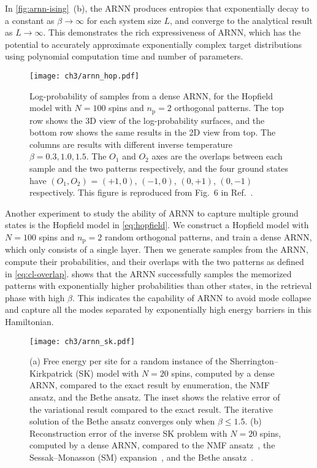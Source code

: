 In \cref{fig:arnn-ising}~(b), the ARNN produces entropies that exponentially decay to a constant as $\beta \to \infty$ for each system size $L$, and converge to the analytical result as $L \to \infty$. This demonstrates the rich expressiveness of ARNN, which has the potential to accurately approximate exponentially complex target distributions using polynomial computation time and number of parameters.

\begin{figure}[htb]
\centering
\texttt{[image: ch3/arnn\_hop.pdf]}
\caption[ARNN results of Hopfield model]{
Log-probability of samples from a dense ARNN, for the Hopfield model with $N = 100$ spins and $n_\text{p} = 2$ orthogonal patterns.
The top row shows the 3D view of the log-probability surfaces, and the bottom row shows the same results in the 2D view from top.
The columns are results with different inverse temperature $\beta = 0.3, 1.0, 1.5$.
The $O_1$ and $O_2$ axes are the overlaps between each sample and the two patterns respectively, and the four ground states have $(O_1, O_2)$ = $(+1, 0)$, $(-1, 0)$, $(0, +1)$, $(0, -1)$ respectively.
This figure is reproduced from Fig.~6 in Ref.~\cite{wu2019solving}.
}
\label{fig:arnn-hop}
\end{figure}

Another experiment to study the ability of ARNN to capture multiple ground states is the Hopfield model in \cref{eq:hopfield}. We construct a Hopfield model with $N = 100$ spins and $n_\text{p} = 2$ random orthogonal patterns, and train a dense ARNN, which only consists of a single layer. Then we generate samples from the ARNN, compute their probabilities, and their overlaps with the two patterns as defined in \cref{eq:cl-overlap}.  shows that the ARNN successfully samples the memorized patterns with exponentially higher probabilities than other states, in the retrieval phase with high $\beta$. This indicates the capability of ARNN to avoid mode collapse and capture all the modes separated by exponentially high energy barriers in this Hamiltonian.

\begin{figure}[htb]
\centering
\texttt{[image: ch3/arnn\_sk.pdf]}
\caption[ARNN results of Sherrington--Kirkpatrick (SK) model and inverse SK problem]{
(a) Free energy per site for a random instance of the Sherrington--Kirkpatrick (SK) model with $N = 20$ spins, computed by a dense ARNN, compared to the exact result by enumeration, the NMF ansatz, and the Bethe ansatz. The inset shows the relative error of the variational result compared to the exact result.
The iterative solution of the Bethe ansatz converges only when $\beta \le 1.5$.
(b) Reconstruction error of the inverse SK problem with $N = 20$ spins, computed by a dense ARNN, compared to the NMF ansatz~\cite{roudi2009ising}, the Sessak--Monasson (SM) expansion~\cite{sessak2009small}, and the Bethe ansatz~\cite{ricci2012bethe}.
}
\label{fig:arnn-sk}
\end{figure}

